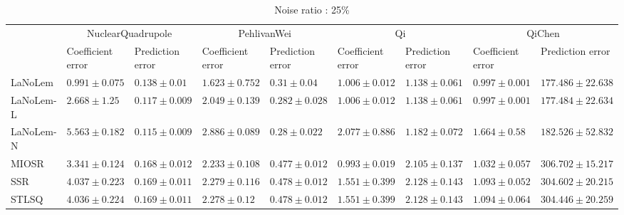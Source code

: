 \begin{table*}
\centering
\caption{Noise ratio : 25\%}
\label{}
\scalebox{0.7}
{
\begin{tabular}{lllllllll}
\toprule
 & \multicolumn{2}{c}{NuclearQuadrupole} & \multicolumn{2}{c}{PehlivanWei} & \multicolumn{2}{c}{Qi} & \multicolumn{2}{c}{QiChen} \\
 & Coefficient error & Prediction error & Coefficient error & Prediction error & Coefficient error & Prediction error & Coefficient error & Prediction error \\
\midrule
LaNoLem & $\mathbf{0.991}\pm 0.075$ & $0.138\pm 0.01$ & $\mathbf{1.623}\pm 0.752$ & $0.31\pm 0.04$ & $1.006\pm 0.012$ & $\mathbf{1.138}\pm 0.061$ & $0.997\pm 0.001$ & $177.486\pm 22.638$ \\
LaNoLem-L & $2.668\pm 1.25$ & $0.117\pm 0.009$ & $2.049\pm 0.139$ & $0.282\pm 0.028$ & $1.006\pm 0.012$ & $1.138\pm 0.061$ & $\mathbf{0.997}\pm 0.001$ & $\mathbf{177.484}\pm 22.634$ \\
LaNoLem-N & $5.563\pm 0.182$ & $\mathbf{0.115}\pm 0.009$ & $2.886\pm 0.089$ & $\mathbf{0.28}\pm 0.022$ & $2.077\pm 0.886$ & $1.182\pm 0.072$ & $1.664\pm 0.58$ & $182.526\pm 52.832$ \\
MIOSR & $3.341\pm 0.124$ & $0.168\pm 0.012$ & $2.233\pm 0.108$ & $0.477\pm 0.012$ & $\mathbf{0.993}\pm 0.019$ & $2.105\pm 0.137$ & $1.032\pm 0.057$ & $306.702\pm 15.217$ \\
SSR & $4.037\pm 0.223$ & $0.169\pm 0.011$ & $2.279\pm 0.116$ & $0.478\pm 0.012$ & $1.551\pm 0.399$ & $2.128\pm 0.143$ & $1.093\pm 0.052$ & $304.602\pm 20.215$ \\
STLSQ & $4.036\pm 0.224$ & $0.169\pm 0.011$ & $2.278\pm 0.12$ & $0.478\pm 0.012$ & $1.551\pm 0.399$ & $2.128\pm 0.143$ & $1.094\pm 0.064$ & $304.446\pm 20.259$ \\

\midrule


\end{tabular}}
\end{table*}
